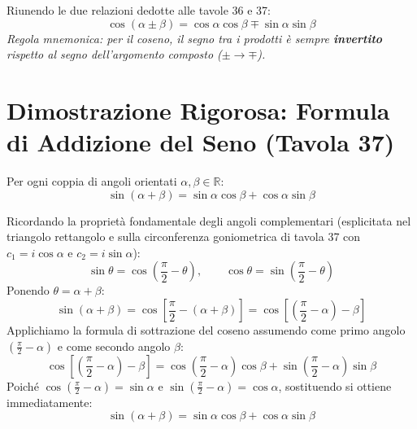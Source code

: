 \documentclass[11pt,a4paper,oneside]{report}
\begin{document}
\begin{metodo}
Riunendo le due relazioni dedotte alle tavole 36 e 37:
\begin{equation}
    \cos(\alpha \pm \beta) = \cos\alpha\cos\beta \mp \sin\alpha\sin\beta
\end{equation}
\textit{Regola mnemonica: per il coseno, il segno tra i prodotti \`e sempre \textbf{invertito} rispetto al segno dell'argomento composto ($\pm \to \mp$).}
\end{metodo}

\section{Dimostrazione Rigorosa: Formula di Addizione del Seno (Tavola 37)}

\begin{teorema}
Per ogni coppia di angoli orientati $\alpha, \beta \in \mathbb{R}$:
\begin{equation}
    \sin(\alpha + \beta) = \sin\alpha\cos\beta + \cos\alpha\sin\beta
\end{equation}
\end{teorema}

\begin{dimostrazione}
Ricordando la propriet\`a fondamentale degli angoli complementari (esplicitata nel triangolo rettangolo e sulla circonferenza goniometrica di tavola 37 con $c_1 = i\cos\alpha$ e $c_2 = i\sin\alpha$):
\begin{equation}
    \sin\theta = \cos\left(\frac{\pi}{2} - \theta\right), \qquad \cos\theta = \sin\left(\frac{\pi}{2} - \theta\right)
\end{equation}
Ponendo $\theta = \alpha + \beta$:
\begin{equation}
    \sin(\alpha + \beta) = \cos\left[\frac{\pi}{2} - (\alpha + \beta)\right] = \cos\left[\left(\frac{\pi}{2} - \alpha\right) - \beta\right]
\end{equation}
Applichiamo la formula di sottrazione del coseno assumendo come primo angolo $\left(\frac{\pi}{2} - \alpha\right)$ e come secondo angolo $\beta$:
\begin{equation}
    \cos\left[\left(\frac{\pi}{2} - \alpha\right) - \beta\right] = \cos\left(\frac{\pi}{2} - \alpha\right)\cos\beta + \sin\left(\frac{\pi}{2} - \alpha\right)\sin\beta
\end{equation}
Poich\'e $\cos\left(\frac{\pi}{2} - \alpha\right) = \sin\alpha$ e $\sin\left(\frac{\pi}{2} - \alpha\right) = \cos\alpha$, sostituendo si ottiene immediatamente:
\begin{equation}
    \sin(\alpha + \beta) = \sin\alpha\cos\beta + \cos\alpha\sin\beta
\end{equation}
\end{dimostrazione}
\end{document}
